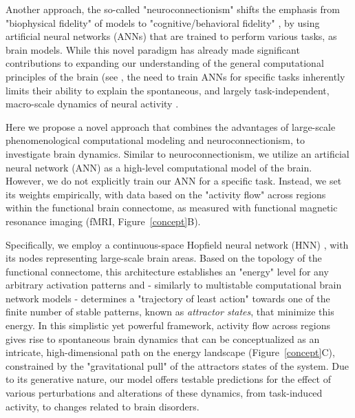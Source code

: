 \documentclass{article}
\begin{document}
Another approach, the so-called "neuroconnectionism" \citep{doerig2023neuroconnectionist} shifts the emphasis from "biophysical fidelity" of models to "cognitive/behavioral fidelity" \citep{kriegeskorte2018cognitive}, by using artificial neural networks (ANNs) that are trained to perform various tasks, as brain models. While this novel paradigm has already made significant contributions to expanding our understanding of the general computational principles of the brain (see \cite{doerig2023neuroconnectionist}, the need to train ANNs for specific tasks inherently limits their ability to explain the spontaneous, and largely task-independent, macro-scale dynamics of neural activity \citep{richards2019deep}.

Here we propose a novel approach that combines the advantages of large-scale phenomenological computational modeling and neuroconnectionism, to investigate brain dynamics.
Similar to neuroconnectionism, we utilize an artificial neural network (ANN) as a high-level computational model of the brain.
However, we do not explicitly train our ANN for a specific task. Instead, we set its weights empirically, with data based on the "activity flow" \citep{cole2016activity, ito2017cognitive} across regions within the functional brain connectome, as measured with functional magnetic resonance imaging (fMRI, Figure~\ref{concept}B).

Specifically, we employ a continuous-space Hopfield neural network (HNN) \citep{hopfield1982neural, krotov2023new}, with its nodes representing large-scale brain areas. Based on the topology of the functional connectome, this architecture establishes an "energy" level for any arbitrary activation patterns and - similarly to multistable computational brain network models \citep{schirner2022dynamic} - determines a "trajectory of least action" towards one of the finite number of stable patterns, known as \textit{attractor states}, that minimize this energy.
In this simplistic yet powerful framework, activity flow \citep{cole2016activity} across regions gives rise to spontaneous brain dynamics that can be conceptualized as an intricate, high-dimensional path on the energy landscape (Figure~\ref{concept}C), constrained by the "gravitational pull" of the attractors states of the system.
Due to its generative nature, our model offers testable predictions for the effect of various perturbations and alterations of these dynamics, from task-induced activity, to changes related to brain disorders.
\end{document}
